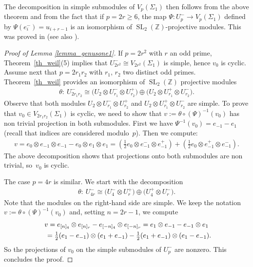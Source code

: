 \documentclass[11pt]{article}
\newcommand{\SL}{\operatorname{SL}}
\numberwithin{equation}{section}
\begin{document}
The decomposition in simple submodules of $V_p(\Sigma_1)$ then follows from the above theorem and from the fact that if $p=2r\geq 6$, the map $\Psi\colon U_p^- \rightarrow V_{p}(\Sigma_1)$
defined by $\Psi(e_i^-) = u_{i+r-1}$ is an isomorphism of $\SL_2(\mathbb{Z})$-projective modules. This was proved in \cite{FK} (see also \cite[Theorem~5.1]{Koju1}).

\begin{proof}[Proof of Lemma \ref{lemma_genusone1}]If $p=2r^2$ with $r$ an odd prime, Theorem~\ref{th_weil}(5) implies that $U_{2 r^2}^- \cong V_{2r^2}(\Sigma_1)$ is simple, hence $v_0$ is cyclic. Assume next that $p=2r_1r_2$ with $r_1$, $r_2$ two distinct odd primes. Theorem~\ref{th_weil} provides an isomorphism of $\SL_2(\mathbb{Z})$ projective modules
\begin{gather*} \theta \colon \ U_{2r_1r_2}^- \cong \big(U_2\otimes U_{r_1}^-\otimes U_{r_2}^+\big) \oplus \big(U_2\otimes U_{r_1}^+ \otimes U_{r_2}^-\big).\end{gather*}
Observe that both modules $U_2\otimes U_{r_1}^-\otimes U_{r_2}^+$ and $U_2\otimes U_{r_1}^+ \otimes U_{r_2}^-$ are simple. To prove that $v_0 \in V_{2r_1r_2}(\Sigma_1)$ is cyclic, we need to show that $v:= \theta\circ (\Psi)^{-1} (v_0) $ has non trivial projection in both submodules. First we have $\Psi^{-1}(v_0) = e_{-1} - e_1$ (recall that indices are considered modulo~$p$). Then we compute:
\begin{gather*} v = e_0\otimes e_{-1} \otimes e_{-1} - e_0\otimes e_1\otimes e_1 = \left( \tfrac{1}{2} e_0 \otimes e_{-1}^- \otimes e_{-1}^+ \right) + \left(\tfrac{1}{2} e_0\otimes e_{-1}^+\otimes e_{-1}^- \right).\end{gather*}
The above decomposition shows that projections onto both submodules are non trivial, so~$v_0$ is cyclic.

The case $p=4r$ is similar. We start with the decomposition
\begin{gather*} \theta \colon \ U_{4r}^- \cong \big(U_4^- \otimes U_r^+\big) \oplus \big(U_4^+ \otimes U_r^-\big).\end{gather*}
Note that the modules on the right-hand side are simple. We keep the notation $v:=\theta\circ (\Psi)^{-1}(v_0)$ and, setting $n=2r-1$, we compute
\begin{gather*} v= e_{[n]_4}\otimes e_{[n]_r} - e_{[-n]_4}\otimes e_{[-n]_r} = e_1\otimes e_{-1} - e_{-1}\otimes e_1 \\
\hphantom{v}{} = \tfrac{1}{2}(e_1-e_{-1})\otimes (e_1+e_{-1}) - \tfrac{1}{2}(e_1+e_{-1})\otimes (e_1-e_{-1}).
\end{gather*}
So the projections of $v_0$ on the simple submodules of $U_p^-$ are nonzero. This concludes the proof.
\end{proof}
\end{document}
